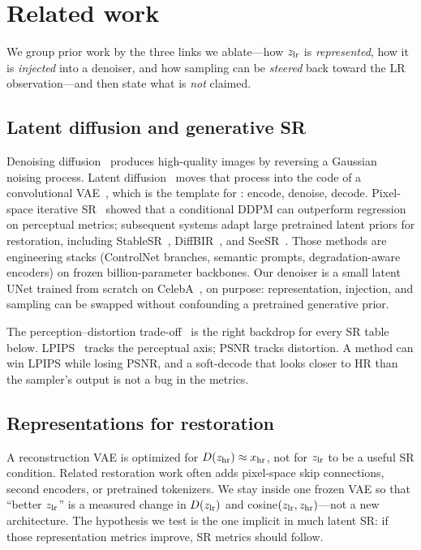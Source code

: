 \section{Related work}
\label{sec:related}

We group prior work by the three links we ablate---how $z_{\mathrm{lr}}$ is
\emph{represented}, how it is \emph{injected} into a denoiser, and
how sampling can be \emph{steered} back toward the LR
observation---and then state what is \emph{not} claimed.

\subsection{Latent diffusion and generative SR}
Denoising diffusion~\citep{ho2020denoising} produces high-quality
images by reversing a Gaussian noising process.
Latent diffusion~\citep{rombach2022high} moves that process into the
code of a convolutional VAE~\citep{kingma2014auto}, which is the
template for \lsrmethod{}: encode, denoise, decode.
Pixel-space iterative SR~\citep{saharia2023image} showed that a
conditional DDPM can outperform regression on perceptual metrics;
subsequent systems adapt large pretrained latent priors for
restoration, including StableSR~\citep{wang2024exploiting},
DiffBIR~\citep{lin2024diffbir}, and
SeeSR~\citep{wu2024seesr}.
Those methods are engineering stacks (ControlNet branches, semantic
prompts, degradation-aware encoders) on frozen billion-parameter
backbones.
Our denoiser is a small latent UNet trained from scratch on
CelebA~\citep{liu2015faceattributes}, on purpose:
representation, injection, and sampling can be swapped without
confounding a pretrained generative prior.

The perception--distortion trade-off~\citep{blau2018perception} is
the right backdrop for every SR table below.
LPIPS~\citep{zhang2018unreasonable} tracks the perceptual axis;
PSNR tracks distortion.
A method can win LPIPS while losing PSNR, and a soft-decode that
looks closer to HR than the sampler's output is not a bug in the
metrics.

\subsection{Representations for restoration}
A reconstruction VAE is optimized for $D(z_{\mathrm{hr}})\approx x_{\mathrm{hr}}$, not
for $z_{\mathrm{lr}}$ to be a useful SR condition.
Related restoration work often adds pixel-space skip connections,
second encoders, or pretrained tokenizers.
We stay inside one frozen VAE so that ``better $z_{\mathrm{lr}}$'' is a measured
change in $D(z_{\mathrm{lr}})$ and cosine$(z_{\mathrm{lr}},z_{\mathrm{hr}})$---not a new
architecture.
The hypothesis we test is the one implicit in much latent SR:
if those representation metrics improve, SR metrics should follow.

